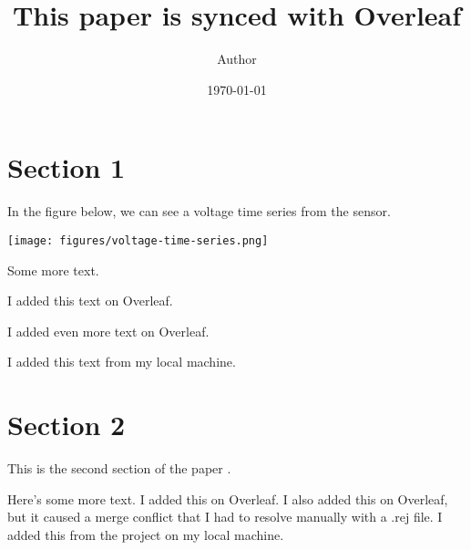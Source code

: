 \documentclass[11pt]{article}
\title{This paper is synced with Overleaf}
\author{ Author }
\date{\today}
\begin{document}
\maketitle
\pagebreak



\section{Section 1}

In the figure below,
we can see a voltage time series from the sensor.

\texttt{[image: figures/voltage-time-series.png]}

Some more text.

I added this text on Overleaf.

I added even more text on Overleaf.

I added this text from my local machine.

\pagebreak
\section{Section 2}

This is the second section of the paper \cite{AbramowitzStegun1970}.

Here's some more text.
I added this on Overleaf.
I also added this on Overleaf, but it caused a merge conflict that I had
to resolve manually with a .rej file.
I added this from the project on my local machine.




\end{document}
